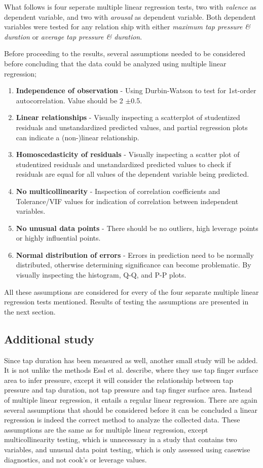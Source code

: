 \documentclass{sigchi}
\begin{document}
What follows is four seperate multiple linear regression tests, two with \textit{valence} as dependent variable, and two with \textit{arousal} as dependent variable. Both dependent variables were tested for any relation ship with either \textit{maximum tap pressure \& duration} or \textit{average tap pressure \& duration}.

Before proceeding to the results, several assumptions needed to be considered before concluding that the data could be analyzed using multiple linear regression;
\begin{enumerate}
  \item \textbf{Independence of observation} - Using Durbin-Watson to test for 1st-order autocorrelation. Value should be 2 $\pm$0.5.
  \item \textbf{Linear relationships} - Visually inspecting a scatterplot of studentized residuals and unstandardized predicted values, and partial regression plots can indicate a (non-)linear relationship.
  \item \textbf{Homoscedasticity of residuals} - Visually inspecting a scatter plot of studentized residuals and unstandardized predicted values to check if residuals are equal for all values of the dependent variable being predicted.
  \item \textbf{No multicollinearity} - Inspection of correlation coefficients and Tolerance/VIF values for indication of correlation between independent variables.
  \item \textbf{No unusual data points} - There should be no outliers, high leverage points or highly influential points.
  \item \textbf{Normal distribution of errors} - Errors in prediction need to be normally distributed, otherwise determining significance can become problematic. By visually inspecting the histogram, Q-Q, and P-P plots.
\end{enumerate}
All these assumptions are considered for every of the four separate multiple linear regression tests mentioned. Results of testing the assumptions are presented in the next section.


\subsection{Additional study} %
\label{sub:additional_study}
Since tap duration has been measured as well, another small study will be added. It is not unlike the methods Essl et al. \cite{Essl2010} describe, where they use tap finger surface area to infer pressure, except it will consider the relationship between tap pressure and tap duration, not tap pressure and tap finger surface area. Instead of multiple linear regression, it entails a regular linear regression. There are again several assumptions that should be considered before it can be concluded a linear regression is indeed the correct method to analyze the collected data. These assumptions are the same as for multiple linear regression, except multicollinearity testing, which is unnecessary in a study that contains two variables, and unusual data point testing, which is only assessed using casewise diagnostics, and not cook's or leverage values.
\end{document}
